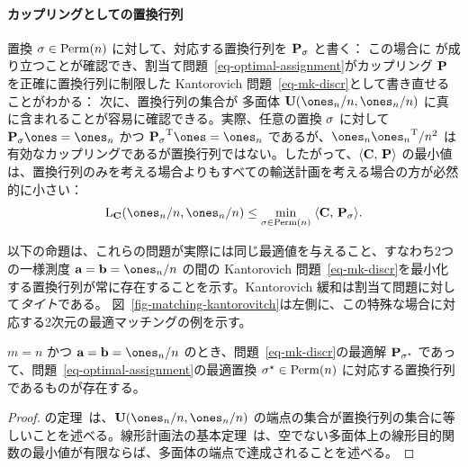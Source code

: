 \paragraph{カップリングとしての置換行列}

置換 $\si\in\Perm(n)$ に対して、対応する置換行列を $\P_{\si}$ と書く：
この場合に
が成り立つことが確認でき、割当て問題~\eqref{eq-optimal-assignment}がカップリング $\P$ を正確に置換行列に制限した Kantorovich 問題~\eqref{eq-mk-discr}として書き直せることがわかる：
次に、置換行列の集合が \citeauthor{birkhoff} 多面体 $\CouplingsD(\ones_n/n,\ones_n/n)$ に真に含まれることが容易に確認できる。実際、任意の置換 $\si$ に対して $\P_{\si}\ones=\ones_n$ かつ $\transp{\P_{\si}}\ones=\ones_n$ であるが、$\ones_n\transp{\ones_n}/n^2$ は有効なカップリングであるが置換行列ではない。したがって、$\dotp{\C}{\P}$ の最小値は、置換行列のみを考える場合よりもすべての輸送計画を考える場合の方が必然的に小さい：
$$ \MKD_{\C}(\ones_n/n,\ones_n/n) \leq \umin{\si \in \Perm(n)} \dotp{\C}{\P_{\si}}.$$

以下の命題は、これらの問題が実際には同じ最適値を与えること、すなわち2つの一様測度 $\a=\b=\ones_n/n$ の間の Kantorovich 問題~\eqref{eq-mk-discr}を最小化する置換行列が常に存在することを示す。Kantorovich 緩和は割当て問題に対して\emph{タイト}である。
%
図~\ref{fig-matching-kantorovitch}は左側に、この特殊な場合に対応する2次元の最適マッチングの例を示す。
%

\begin{prop}\label{prop-matching-kanto}
	$m=n$ かつ $\a=\b=\ones_n/n$ のとき、問題~\eqref{eq-mk-discr}の最適解 $\P_{\si^\star}$ であって、問題~\eqref{eq-optimal-assignment}の最適置換 $\si^\star \in \Perm(n)$ に対応する置換行列であるものが存在する。
\end{prop}

\begin{proof}
	\citeauthor{birkhoff}の定理~\citeyearpar{birkhoff}は、$\CouplingsD(\ones_n/n,\ones_n/n)$ の端点の集合が置換行列の集合に等しいことを述べる。線形計画法の基本定理~\citep[Theorem 2.7]{bertsimas1997introduction}は、空でない多面体上の線形目的関数の最小値が有限ならば、多面体の端点で達成されることを述べる。
\end{proof}

